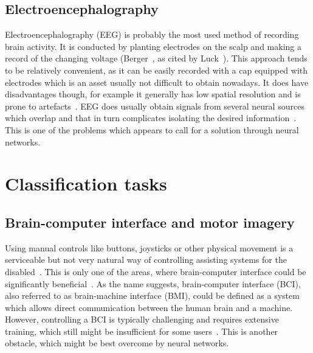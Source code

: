 \documentclass[english, he, bc, kiv, iso690alph]{fasthesis}
\begin{document}
\subsection{Electroencephalography}

Electroencephalography (EEG) is probably the most used method of recording brain activity. It is conducted by planting electrodes on the scalp and making a record of the changing voltage (Berger~\cite{berger:eeg:29}, as cited by Luck~\cite{luck:erp:book}). This approach tends to be relatively convenient, as it can be easily recorded with a cap equipped with electrodes which is an asset usually not difficult to obtain nowadays.
It does have disadvantages though, for example it generally has low spatial resolution and is prone to artefacts~\cite{berezutskaya:ieeg:22}. EEG does usually obtain signals from several neural sources which overlap and that in turn complicates isolating the desired information~\cite{luck:erp:book}. This is one of the problems which appears to call for a solution through neural networks.


\section{Classification tasks}

\subsection{Brain-computer interface and motor imagery}

Using manual controls like buttons, joysticks or other physical movement is a serviceable but not very natural way of controlling assisting systems for the disabled~\cite{he:bci:legs:18}. This is only one of the areas, where brain-computer interface could be significantly beneficial~\cite{craik:dl:eeg:rev:19}.
As the name suggests, brain-computer interface (BCI), also referred to as brain-machine interface (BMI), could be defined as a system which allows direct communication between the human brain and a machine. However, controlling a BCI is typically challenging and requires extensive training, which still might be insufficient for some users~\cite{data:stieger:21}.
This is another obstacle, which might be best overcome by neural networks.
\end{document}
